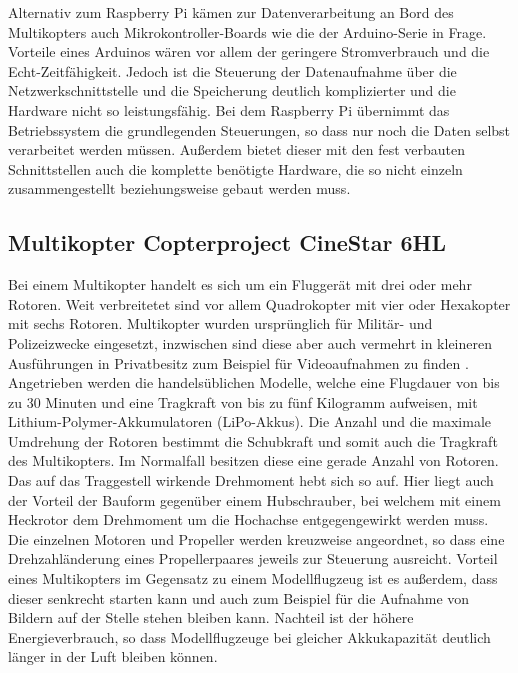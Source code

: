 \documentclass[a4paper,12pt,bibliography=totoc, listof=totoc,titlepage,pointlessnumbers]{scrreprt}
\begin{document}
Alternativ zum Raspberry Pi kämen zur Datenverarbeitung an Bord des Multikopters auch Mikrokontroller-Boards wie die der Arduino-Serie in Frage. Vorteile eines Arduinos wären vor allem der geringere Stromverbrauch und die Echt-Zeitfähigkeit. Jedoch ist die Steuerung der Datenaufnahme über die Netzwerkschnittstelle und die Speicherung deutlich komplizierter und die Hardware nicht so leistungsfähig. Bei dem Rasp\-berry Pi übernimmt das Betriebssystem die grundlegenden Steuerungen, so dass nur noch die Daten selbst verarbeitet werden müssen. Außerdem bietet dieser mit den fest verbauten Schnittstellen auch die komplette benötigte Hardware, die so nicht einzeln zusammengestellt beziehungsweise gebaut werden muss.


\subsection{Multikopter Copterproject CineStar 6HL}
Bei einem Multikopter handelt es sich um ein Fluggerät mit drei oder mehr Rotoren. Weit verbreitetet sind vor allem Quadrokopter mit vier oder Hexakopter mit sechs Rotoren. Multikopter wurden ursprünglich für Militär- und Polizeizwecke eingesetzt, inzwischen sind diese aber auch vermehrt in kleineren Ausführungen in Privatbesitz zum Beispiel für Videoaufnahmen zu finden \citep{Quadro}. Angetrieben werden die handelsüblichen Modelle, welche eine Flugdauer von bis zu 30 Minuten und eine Tragkraft von bis zu fünf Kilogramm aufweisen, mit Lithium-Polymer-Akkumulatoren (LiPo-Akkus). Die Anzahl und die maximale Umdrehung der Rotoren bestimmt die Schubkraft und somit auch die Tragkraft des Multikopters. Im Normalfall besitzen diese eine gerade Anzahl von Rotoren. Das auf das Traggestell wirkende Drehmoment hebt sich so auf. Hier liegt auch der Vorteil der Bauform gegenüber einem Hubschrauber, bei welchem mit einem Heckrotor dem Drehmoment um die Hochachse entgegengewirkt werden muss. Die einzelnen Motoren und Propeller werden kreuzweise angeordnet, so dass eine Drehzahländerung eines Propellerpaares jeweils zur Steuerung ausreicht. Vorteil eines Multikopters im Gegensatz zu einem Modellflugzeug ist es außerdem, dass dieser senkrecht starten kann und auch zum Beispiel für die Aufnahme von Bildern auf der Stelle stehen bleiben kann. Nachteil ist der höhere Energieverbrauch, so dass Modellflugzeuge bei gleicher Akkukapazität deutlich länger in der Luft bleiben können. \citep{Bachfeld}
\end{document}
